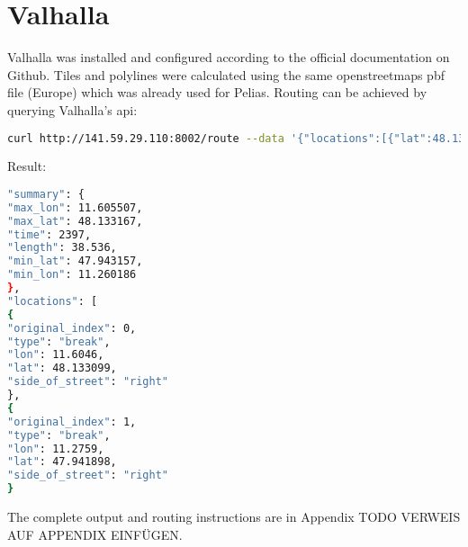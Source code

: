 
\section{Valhalla}
Valhalla was installed and configured according to the official documentation on Github.
Tiles and polylines were calculated using the same openstreetmaps pbf file (Europe) which was already used for Pelias. Routing can be achieved by querying Valhalla’s api:

\begin{lstlisting}[language=bash,breaklines=true]
curl http://141.59.29.110:8002/route --data '{"locations":[{"lat":48.1331,"lon":11.6046,"type":"break"},{"lat":47.9419,"lon":11.2759,"type":"break"}],"costing":"auto","directions_options":{"units":"km"}}' | jq '.'
\end{lstlisting}

Result:

\begin{lstlisting}[language=bash,breaklines=true]
"summary": {
"max_lon": 11.605507,
"max_lat": 48.133167,
"time": 2397,
"length": 38.536,
"min_lat": 47.943157,
"min_lon": 11.260186
},
"locations": [
{
"original_index": 0,
"type": "break",
"lon": 11.6046,
"lat": 48.133099,
"side_of_street": "right"
},
{
"original_index": 1,
"type": "break",
"lon": 11.2759,
"lat": 47.941898,
"side_of_street": "right"
}
\end{lstlisting}

The complete output and routing instructions are in Appendix TODO VERWEIS AUF APPENDIX EINFÜGEN.